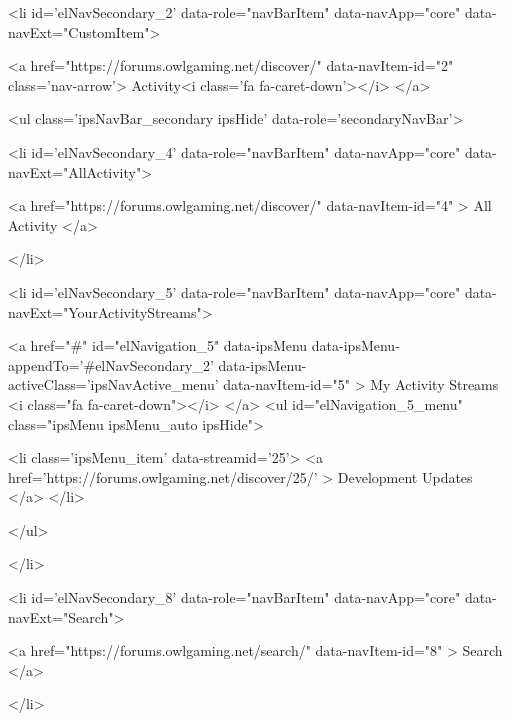	

	
		
		
		<li  id='elNavSecondary_2' data-role="navBarItem" data-navApp="core" data-navExt="CustomItem">
			
			
				<a href="https://forums.owlgaming.net/discover/"  data-navItem-id="2"  class='nav-arrow'>
					Activity<i class='fa fa-caret-down'></i>
				</a>
			
			
				<ul class='ipsNavBar_secondary ipsHide' data-role='secondaryNavBar'>
					


	
		
		
		<li  id='elNavSecondary_4' data-role="navBarItem" data-navApp="core" data-navExt="AllActivity">
			
			
				<a href="https://forums.owlgaming.net/discover/"  data-navItem-id="4"  >
					All Activity
				</a>
			
			
		</li>
	
	

	
		
		
		<li  id='elNavSecondary_5' data-role="navBarItem" data-navApp="core" data-navExt="YourActivityStreams">
			
			
				<a href="#" id="elNavigation_5" data-ipsMenu data-ipsMenu-appendTo='#elNavSecondary_2' data-ipsMenu-activeClass='ipsNavActive_menu' data-navItem-id="5" >
					My Activity Streams <i class="fa fa-caret-down"></i>
				</a>
				<ul id="elNavigation_5_menu" class="ipsMenu ipsMenu_auto ipsHide">
					

	
		
			<li class='ipsMenu_item' data-streamid='25'>
				<a href='https://forums.owlgaming.net/discover/25/' >
					Development Updates
				</a>
			</li>
		
	

				</ul>
			
			
		</li>
	
	

	
	

	
	

	
		
		
		<li  id='elNavSecondary_8' data-role="navBarItem" data-navApp="core" data-navExt="Search">
			
			
				<a href="https://forums.owlgaming.net/search/"  data-navItem-id="8"  >
					Search
				</a>
			
			
		</li>
	
	

	
	

